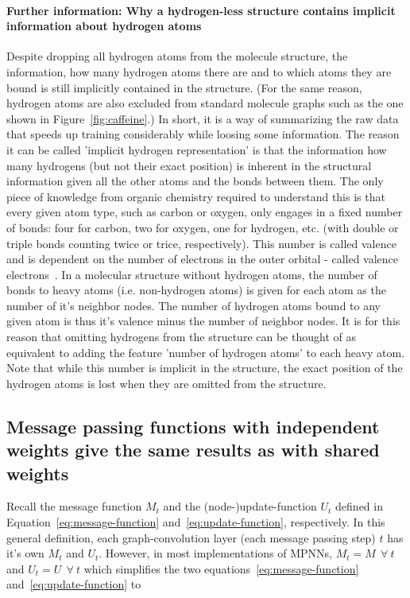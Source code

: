 \paragraph*{Further information: Why a hydrogen-less structure contains implicit information about hydrogen atoms}
Despite dropping all hydrogen atoms from the molecule structure, the information, how many hydrogen atoms there are and to which atoms they are bound is still implicitly contained in the structure. (For the same reason, hydrogen atoms are also excluded from standard molecule graphs such as the one shown in Figure~\ref{fig:caffeine}.) In short, it is a way of summarizing the raw data that speeds up training considerably while loosing some information. The reason it can be called 'implicit hydrogen representation' is that the information how many hydrogens (but not their exact position) is inherent in the structural information given all the other atoms and the bonds between them. The only piece of knowledge from organic chemistry required to understand this is that every given atom type, such as carbon or oxygen, only engages in a fixed number of bonds: four for carbon, two for oxygen, one for hydrogen, etc. (with double or triple bonds counting twice or trice, respectively). This number is called valence and is dependent on the number of electrons in the outer orbital - called valence electrons~\cite{Organic-chemistry}. In a molecular structure without hydrogen atoms, the number of bonds to heavy atoms (i.e. non-hydrogen atoms) is given for each atom as the number of it's neighbor nodes. The number of hydrogen atoms bound to any given atom is thus it's valence minus the number of neighbor nodes. It is for this reason that omitting hydrogens from the structure can be thought of as equivalent to adding the feature 'number of hydrogen atoms' to each heavy atom. Note that while this number is implicit in the structure, the exact position of the hydrogen atoms is lost when they are omitted from the structure.



\subsection{Message passing functions with independent weights give the same results as with shared weights}
\label{sec:weight-sharing}

Recall the message function $M_t$ and the (node-)update-function $U_t$ defined in Equation~\ref{eq:message-function} and~\ref{eq:update-function}, respectively. In this general definition, each graph-convolution layer (each message passing step) $t$ has it's own $M_t$ and $U_t$. However, in most implementations of MPNNs, $M_t = M~~\forall~t$ and $U_t = U~~\forall~t$ which simplifies the two equations~\ref{eq:message-function} and~\ref{eq:update-function} to

